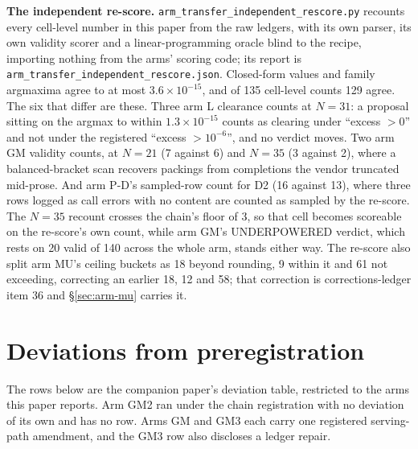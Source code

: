 \textbf{The independent re-score.} \texttt{arm\_transfer\_\bk{}independent\_\bk{}rescore.py}
recounts every cell-level number in this paper from the raw ledgers, with its own parser, its
own validity scorer and a linear-programming oracle blind to the recipe, importing nothing from
the arms' scoring code; its report is
\texttt{arm\_transfer\_\bk{}independent\_\bk{}rescore.json}. Closed-form values and family
argmaxima agree to at most $3.6 \times 10^{-15}$, and of 135 cell-level counts 129 agree. The
six that differ are these. Three arm L clearance counts at $N = 31$: a proposal sitting on the
argmax to within $1.3 \times 10^{-15}$ counts as clearing under ``excess $>0$'' and not under
the registered ``excess $>10^{-6}$'', and no verdict moves. Two arm GM validity counts, at
$N = 21$ (7 against 6) and $N = 35$ (3 against 2), where a balanced-bracket scan recovers
packings from completions the vendor truncated mid-prose. And arm P-D's sampled-row count for
D2 (16 against 13), where three rows logged as call errors with no content are counted as
sampled by the re-score. The $N = 35$ recount crosses the chain's floor of 3, so that cell
becomes scoreable on the re-score's own count, while arm GM's UNDERPOWERED verdict, which
rests on 20 valid of 140 across the whole arm, stands either way. The re-score also split arm
MU's ceiling buckets as 18 beyond rounding, 9 within it and 61 not exceeding, correcting an
earlier 18, 12 and 58; that correction is corrections-ledger item 36 and \S\ref{sec:arm-mu}
carries it.

\section{Deviations from preregistration}\label{supp:deviations}

The rows below are the companion paper's deviation table, restricted to the arms this paper
reports. Arm GM2 ran under the chain registration with no deviation of its own and has no
row. Arms GM and GM3 each carry one registered serving-path amendment, and the GM3 row also
discloses a ledger repair.

